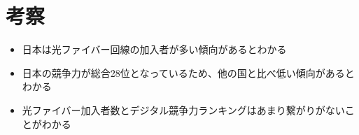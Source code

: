 \documentclass[a4paper,11pt,dvipdfmx]{ujarticle}
\begin{document}
\section{考察}
\begin{itemize}
    \item 日本は光ファイバー回線の加入者が多い傾向があるとわかる
    \item 日本の競争力が総合28位となっているため、他の国と比べ低い傾向があるとわかる
    \item 光ファイバー加入者数とデジタル競争力ランキングはあまり繋がりがないことがわかる
\end{itemize}







%

%


\end{document}
